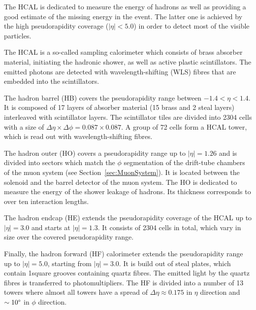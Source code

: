 The HCAL is dedicated to measure the energy of hadrons as well as providing a good estimate of the missing energy in the event.
The latter one is achieved by the high pseudorapidity coverage ($|\eta|<5.0$) in order to detect most of the visible particles.

The HCAL is a so-called sampling calorimeter which consists of brass absorber material, initiating the hadronic shower, as well as active plastic scintillators.
The emitted photons are detected with wavelength-shifting (WLS) fibres that are embedded into the scintillators.

The hadron barrel (HB) covers the pseudorapidity range between $-1.4 < \eta < 1.4$.
It is composed of 17 layers of absorber material (15 brass and 2 steal layers) interleaved with scintillator layers.
The scintillator tiles are divided into 2304 cells with a size of $\Delta \eta \times \Delta \phi = 0.087 \times 0.087$.
A group of 72 cells form a HCAL tower, which is read out with wavelength-shifting fibres.

The hadron outer (HO) covers a pseudorapidity range up to $|\eta|=1.26$ and is divided into sectors which match the $\phi$ segmentation of the drift-tube chambers of the muon system (see Section~\ref{sec:MuonSystem}).
It is located between the solenoid and the barrel detector of the muon system.
The HO is dedicated to measure the energy of the shower leakage of hadrons.
Its thickness corresponds to over ten interaction lengths.

The hadron endcap (HE) extends the pseudorapidity coverage of the HCAL up to $|\eta|=3.0$ and starts at $|\eta|=1.3$.
It consists of 2304 cells in total, which vary in size over the covered pseudorapidity range.

Finally, the hadron forward (HF) calorimeter extends the pseudorapidity range up to $|\eta|=5.0$, starting from $|\eta|=3.0$.
It is build out of steal plates, which contain 1\mm square grooves containing quartz fibres.
The emitted light by the quartz fibres is transferred to photomultipliers.
The HF is divided into a number of 13 towers where almost all towers have a spread of $\Delta \eta \approx 0.175$ in $\eta$ direction and $\sim 10\degree$ in $\phi$ direction.
 

